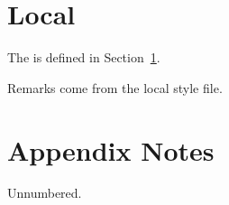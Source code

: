 \documentclass{localclass}
\begin{document}
\section{Local}\label{sec:local}
The  is defined in Section~\ref{sec:local}.
\begin{remark}
Remarks come from the local style file.
\end{remark}
\section*{Appendix Notes}
Unnumbered.
\end{document}
